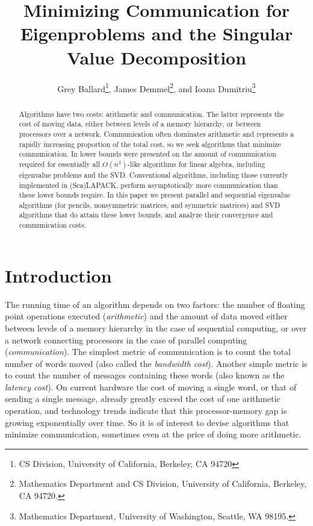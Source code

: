 \documentclass{article}
\title{Minimizing Communication for Eigenproblems and the Singular Value Decomposition}
\author{Grey Ballard\thanks{CS Division, University of California, Berkeley, CA 94720},
James Demmel\thanks{Mathematics Department and CS Division,
University of California, Berkeley, CA 94720.},
and Ioana Dumitriu\thanks{Mathematics Department, University of Washington, Seattle, WA 98195.}}
\theoremstyle{definition}
\begin{document}
\maketitle

\begin{abstract}

Algorithms have two costs: arithmetic and communication. The latter represents the cost of moving data, 
either between levels of a memory hierarchy, or between processors over a
network. Communication often dominates arithmetic and represents a rapidly increasing proportion of the total cost,
so we seek algorithms that minimize communication. In \cite{BDHS10} lower bounds
were presented on the amount of communication required for essentially all
$O(n^3)$-like algorithms for linear algebra, including eigenvalue problems
and the SVD. Conventional algorithms, including those currently implemented in (Sca)LAPACK, perform asymptotically more communication
than these lower bounds require. In this paper we present parallel and sequential
eigenvalue algorithms
(for pencils, nonsymmetric matrices, and symmetric matrices) and SVD algorithms
that do attain these lower bounds, and analyze their convergence and communication
costs.

\end{abstract}

\section{Introduction} \label{Intro} 

The running time of an algorithm depends on two factors: the number of floating point operations executed (\emph{arithmetic}) and the amount of data moved either between levels of a 
memory hierarchy in the case of sequential computing, or over a 
network connecting processors in the case of parallel computing (\emph{communication}). 
The simplest metric of communication is to count the 
total number of words moved (also called the {\em bandwidth cost}).  Another simple metric is to count the number of messages containing these words (also known as the \emph{latency cost}).   
On current hardware the cost of moving a single word, or that of sending a single message, already 
greatly exceed the cost of one arithmetic operation, 
and technology trends indicate that this processor-memory gap is growing 
exponentially over time. So it is of interest to devise 
algorithms that minimize communication, sometimes even 
at the price of doing more arithmetic. 
\end{document}
